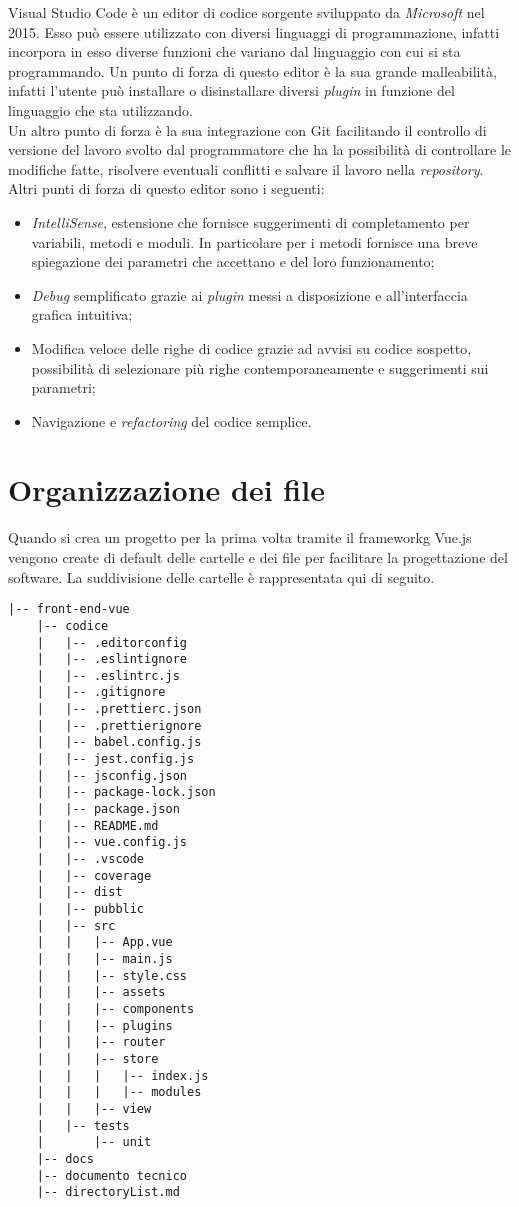 Visual Studio Code è un editor di codice sorgente sviluppato da \textit{Microsoft} nel 2015. Esso può essere utilizzato con diversi linguaggi di programmazione, infatti incorpora in esso diverse funzioni che variano dal linguaggio con cui si sta programmando. Un punto di forza di questo editor è la sua grande malleabilità, infatti l'utente può installare o disinstallare diversi \textit{plugin} in funzione del linguaggio che sta utilizzando.\\
Un altro punto di forza è la sua integrazione con Git facilitando il controllo di versione del lavoro svolto dal programmatore che ha la possibilità di controllare le modifiche fatte, risolvere eventuali conflitti e salvare il lavoro nella \textit{repository}. Altri punti di forza di questo editor sono i seguenti:
\begin{itemize}
	\item \textit{IntelliSense}, estensione che fornisce suggerimenti di completamento per variabili, metodi e moduli. In particolare per i metodi fornisce una breve spiegazione dei parametri che accettano e del loro funzionamento;
	\item \textit{Debug} semplificato grazie ai \textit{plugin} messi a disposizione e all'interfaccia grafica intuitiva;
	\item Modifica veloce delle righe di codice grazie ad avvisi su codice sospetto, possibilità di selezionare più righe contemporaneamente e suggerimenti sui parametri;
	\item Navigazione e \textit{refactoring} del codice semplice.
\end{itemize}

\section{Organizzazione dei file}
\label{sec:organizzazione-file}

Quando si crea un progetto per la prima volta tramite il \gls{frameworkg} Vue.js vengono create di default delle cartelle e dei file per facilitare la progettazione del software. La suddivisione delle cartelle è rappresentata qui di seguito.

\begin{lstlisting}[caption=Organizzazione dei file., label=lst::orgFile]
	|-- front-end-vue
	|-- codice
	|   |-- .editorconfig
	|   |-- .eslintignore
	|   |-- .eslintrc.js
	|   |-- .gitignore
	|   |-- .prettierc.json
	|   |-- .prettierignore
	|   |-- babel.config.js
	|   |-- jest.config.js
	|   |-- jsconfig.json
	|   |-- package-lock.json
	|   |-- package.json
	|   |-- README.md
	|   |-- vue.config.js
	|   |-- .vscode
	|   |-- coverage
	|   |-- dist
	|   |-- pubblic
	|   |-- src
	|   |   |-- App.vue
	|   |   |-- main.js
	|   |   |-- style.css
	|   |   |-- assets
	|   |   |-- components
	|   |   |-- plugins
	|   |   |-- router
	|   |   |-- store
	|   |   |   |-- index.js
	|   |   |   |-- modules
	|   |   |-- view
	|   |-- tests
	|       |-- unit
	|-- docs
	|-- documento tecnico
	|-- directoryList.md
\end{lstlisting}

